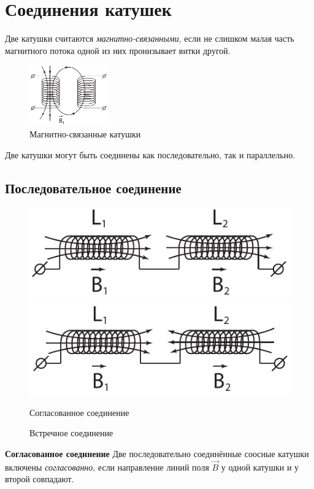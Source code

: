 \section{Соединения катушек}
    
    Две катушки считаются \textit{магнитно-связанными}, если не слишком малая
    часть магнитного потока одной из них пронизывает витки другой.

    \begin{figure}[b!]
        \center
        \includegraphics[width=0.3\textwidth]{lec12/coils_interaction.pdf}
        \caption{Магнитно-связанные катушки}
    \end{figure}
    
    Две катушки могут быть соединены как последовательно, так и параллельно.
    
    \subsection{Последовательное соединение}
    
    \begin{figure}[b!]
        \center
        \includegraphics[width=.47\textwidth]{lec12/agreed_coils.pdf}
        \hfill
        \includegraphics[width=.47\textwidth]{lec12/opposite_coils.pdf}
        \parbox[t]{.47\textwidth}{\caption{Согласованное соединение}}
        \hfill
        \parbox[t]{.47\textwidth}{\caption{Встречное соединение}}
    \end{figure}    

    \textbf{Согласованное соединение}
    Две последовательно соединённые соосные катушки включены
    \textit{согласованно}, если направление линий поля \( \vec{B} \) у одной
    катушки и у второй совпадают.
    
